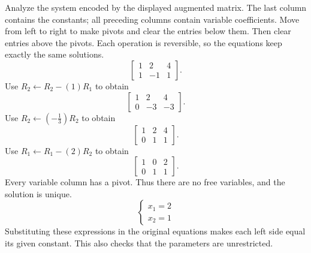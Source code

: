 \goal Analyze the system encoded by the displayed augmented matrix. The last column contains the constants; all preceding columns contain variable coefficients.
\idea Move from left to right to make pivots and clear the entries below them. Then clear entries above the pivots. Each operation is reversible, so the equations keep exactly the same solutions.
\[ \left[\begin{array}{rr|r}1&2&4\\1&-1&1\end{array}\right].\]
Use $R_{2}\leftarrow R_{2}-(1)R_{1}$ to obtain
\[ \left[\begin{array}{rr|r}1&2&4\\0&-3&-3\end{array}\right].\]
Use $R_{2}\leftarrow(- \frac{1}{3})R_{2}$ to obtain
\[ \left[\begin{array}{rr|r}1&2&4\\0&1&1\end{array}\right].\]
Use $R_{1}\leftarrow R_{1}-(2)R_{2}$ to obtain
\[ \left[\begin{array}{rr|r}1&0&2\\0&1&1\end{array}\right].\]
Every variable column has a pivot. Thus there are no free variables, and the solution is unique.
\[ \begin{cases}x_{1}=2\\x_{2}=1\end{cases}\]
Substituting these expressions in the original equations makes each left side equal its given constant. This also checks that the parameters are unrestricted.

